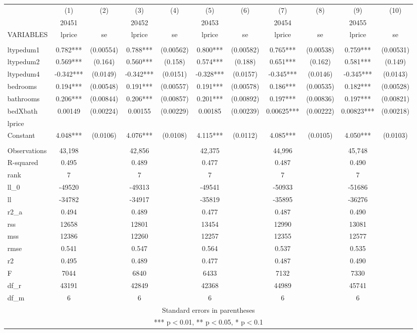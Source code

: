 \documentclass[]{article}
\begin{document}
\begin{tabular}{lcccccccccc} \hline
 & (1) & (2) & (3) & (4) & (5) & (6) & (7) & (8) & (9) & (10) \\
 & 20451 &  & 20452 &  & 20453 &  & 20454 &  & 20455 &  \\
VARIABLES & lprice & se & lprice & se & lprice & se & lprice & se & lprice & se \\ \hline
 &  &  &  &  &  &  &  &  &  &  \\
ltypedum1 & 0.782*** & (0.00554) & 0.788*** & (0.00562) & 0.800*** & (0.00582) & 0.765*** & (0.00538) & 0.759*** & (0.00531) \\
ltypedum2 & 0.569*** & (0.164) & 0.560*** & (0.158) & 0.574*** & (0.188) & 0.651*** & (0.162) & 0.581*** & (0.149) \\
ltypedum4 & -0.342*** & (0.0149) & -0.342*** & (0.0151) & -0.328*** & (0.0157) & -0.345*** & (0.0146) & -0.345*** & (0.0143) \\
bedrooms & 0.194*** & (0.00548) & 0.191*** & (0.00557) & 0.191*** & (0.00578) & 0.186*** & (0.00535) & 0.182*** & (0.00528) \\
bathrooms & 0.206*** & (0.00844) & 0.206*** & (0.00857) & 0.201*** & (0.00892) & 0.197*** & (0.00836) & 0.197*** & (0.00821) \\
bedXbath & 0.00149 & (0.00224) & 0.00155 & (0.00229) & 0.00185 & (0.00239) & 0.00625*** & (0.00222) & 0.00823*** & (0.00218) \\
lprice &  &  &  &  &  &  &  &  &  &  \\
Constant & 4.048*** & (0.0106) & 4.076*** & (0.0108) & 4.115*** & (0.0112) & 4.085*** & (0.0105) & 4.050*** & (0.0103) \\
 &  &  &  &  &  &  &  &  &  &  \\
Observations & 43,198 &  & 42,856 &  & 42,375 &  & 44,996 &  & 45,748 &  \\
R-squared & 0.495 &  & 0.489 &  & 0.477 &  & 0.487 &  & 0.490 &  \\
rank & 7 &  & 7 &  & 7 &  & 7 &  & 7 &  \\
ll\_0 & -49520 &  & -49313 &  & -49541 &  & -50933 &  & -51686 &  \\
ll & -34782 &  & -34917 &  & -35819 &  & -35895 &  & -36276 &  \\
r2\_a & 0.494 &  & 0.489 &  & 0.477 &  & 0.487 &  & 0.490 &  \\
rss & 12658 &  & 12801 &  & 13454 &  & 12990 &  & 13081 &  \\
mss & 12386 &  & 12260 &  & 12257 &  & 12355 &  & 12577 &  \\
rmse & 0.541 &  & 0.547 &  & 0.564 &  & 0.537 &  & 0.535 &  \\
r2 & 0.495 &  & 0.489 &  & 0.477 &  & 0.487 &  & 0.490 &  \\
F & 7044 &  & 6840 &  & 6433 &  & 7132 &  & 7330 &  \\
df\_r & 43191 &  & 42849 &  & 42368 &  & 44989 &  & 45741 &  \\
 df\_m & 6 &  & 6 &  & 6 &  & 6 &  & 6 &  \\ \hline
\multicolumn{11}{c}{ Standard errors in parentheses} \\
\multicolumn{11}{c}{ *** p$<$0.01, ** p$<$0.05, * p$<$0.1} \\
\end{tabular}
\end{document}
